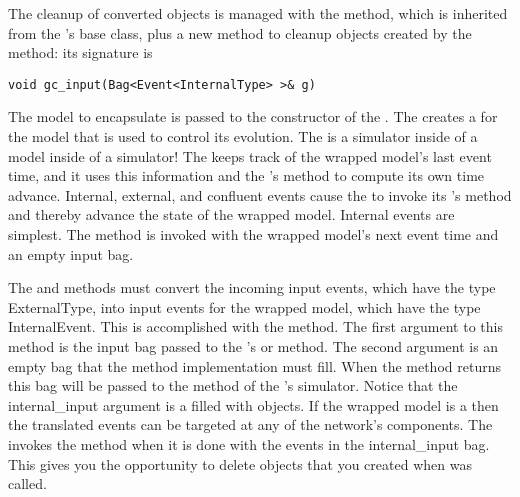 The cleanup of converted objects is managed with the  method, which is inherited from the 's  base class, plus a new  method to cleanup objects created by the  method: its signature is
\begin{verbatim}
void gc_input(Bag<Event<InternalType> >& g)
\end{verbatim}

The model to encapsulate is passed to the constructor of the . The  creates a  for the model that is used to control its evolution. The  is a simulator inside of a model inside of a simulator! The  keeps track of the wrapped model's last event time, and it uses this information and the 's  method to compute its own time advance. Internal, external, and confluent events cause the  to invoke its 's  method and thereby advance the state of the wrapped model. Internal events are simplest. The  method is invoked with the wrapped model's next event time and an empty input bag. 

The  and  methods must convert the incoming input events, which have the type ExternalType, into input events for the wrapped model, which have the type InternalEvent. This is accomplished with the  method. The first argument to this method is the input bag passed to the 's  or  method. The second argument is an empty bag that the method implementation must fill. When the  method returns this bag will be passed to the  method of the 's simulator. Notice that the internal\_input argument is a  filled with  objects. If the wrapped model is a  then the translated events can be targeted at any of the network's components. The  invokes the  method when it is done with the events in the internal\_input bag. This gives you the opportunity to delete objects that you created when  was called.

